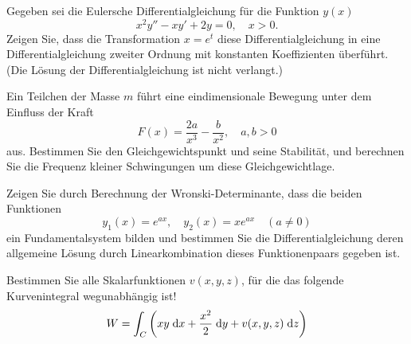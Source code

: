 \begin{atiTask}[
	title = Weitere Fragen,
	language = Deutsch
]
\begin{atiSubtasks}
	\item Gegeben sei die Eulersche Differentialgleichung für die Funktion $y(x)$
	\begin{equation*}
	x^2y''-xy'+2y=0,\quad x>0.
	\end{equation*}
	Zeigen Sie, dass die Transformation $x=e^t$ diese Differentialgleichung in eine Differentialgleichung zweiter Ordnung mit konstanten Koeffizienten überführt. (Die Lösung der Differentialgleichung ist nicht verlangt.)
	\item Ein Teilchen der Masse $m$ führt eine eindimensionale Bewegung unter dem Einfluss der Kraft
	\begin{equation*}
	F(x)=\frac{2a}{x^3}-\frac{b}{x^2},\quad a,b>0
	\end{equation*}
	aus.
	Bestimmen Sie den Gleichgewichtspunkt und seine Stabilität, und berechnen Sie die Frequenz kleiner Schwingungen um diese Gleichgewichtlage.
	\item Zeigen Sie durch Berechnung der Wronski-Determinante, dass die beiden Funktionen
	\begin{equation*}
	y_1(x)=e^{ax},\quad y_2(x)=xe^{ax}\quad (a\neq 0)
	\end{equation*}
	ein Fundamentalsystem bilden und bestimmen Sie die Differentialgleichung deren allgemeine Lösung durch Linearkombination dieses Funktionenpaars gegeben ist.
	\item Bestimmen Sie alle Skalarfunktionen $v(x,y,z)$, für die das folgende Kurvenintegral wegunabhängig ist!
	\begin{equation*}
	W=\int_C \left(xy\D x+\frac{x^2}{2}\D y+v(x,y,z)\D z\right) %
	\end{equation*}
	\end{atiSubtasks}
\end{atiTask}
